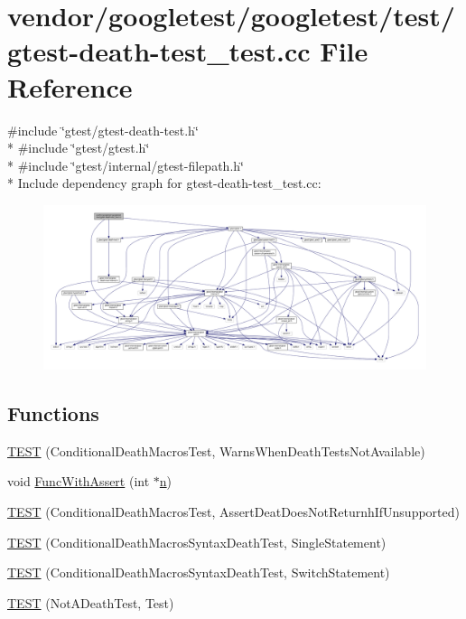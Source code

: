 \hypertarget{gtest-death-test__test_8cc}{}\section{vendor/googletest/googletest/test/gtest-\/death-\/test\+\_\+test.cc File Reference}
\label{gtest-death-test__test_8cc}
{\ttfamily \#include \char`\"{}gtest/gtest-\/death-\/test.\+h\char`\"{}}\\*
{\ttfamily \#include \char`\"{}gtest/gtest.\+h\char`\"{}}\\*
{\ttfamily \#include \char`\"{}gtest/internal/gtest-\/filepath.\+h\char`\"{}}\\*
Include dependency graph for gtest-\/death-\/test\+\_\+test.cc\+:
\nopagebreak
\begin{figure}[H]
\begin{center}
\leavevmode
\includegraphics[width=350pt]{gtest-death-test__test_8cc__incl}
\end{center}
\end{figure}
\subsection*{Functions}
\begin{DoxyCompactItemize}
\item 
\hyperlink{gtest-death-test__test_8cc_a8a47cdbd11c2456db464fe098d134aa0}{T\+E\+ST} (Conditional\+Death\+Macros\+Test, Warns\+When\+Death\+Tests\+Not\+Available)
\item 
void \hyperlink{gtest-death-test__test_8cc_afe40addf0e0bb4657d18f512092ef03b}{Func\+With\+Assert} (int $\ast$\hyperlink{app_2main_8cpp_acfc02ec89670db29251fda6a66602ce2}{n})
\item 
\hyperlink{gtest-death-test__test_8cc_acdbff3626995270fcbcc0b97e303d742}{T\+E\+ST} (Conditional\+Death\+Macros\+Test, Assert\+Deat\+Does\+Not\+Returnh\+If\+Unsupported)
\item 
\hyperlink{gtest-death-test__test_8cc_aacb04a80e0263de84b203b95cc421437}{T\+E\+ST} (Conditional\+Death\+Macros\+Syntax\+Death\+Test, Single\+Statement)
\item 
\hyperlink{gtest-death-test__test_8cc_a8d27f7b1efa4db83935274467e17f40c}{T\+E\+ST} (Conditional\+Death\+Macros\+Syntax\+Death\+Test, Switch\+Statement)
\item 
\hyperlink{gtest-death-test__test_8cc_af77aa369d8ed7d7ceefda4e7b073b05a}{T\+E\+ST} (Not\+A\+Death\+Test, Test)
\end{DoxyCompactItemize}


